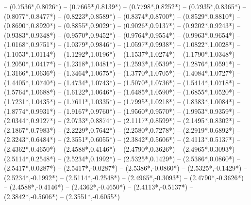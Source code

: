 {	-- ({0.7536*\dx},{0.8026*\dy})
	-- ({0.7665*\dx},{0.8139*\dy})
	-- ({0.7798*\dx},{0.8252*\dy})
	-- ({0.7935*\dx},{0.8365*\dy})
	-- ({0.8077*\dx},{0.8477*\dy})
	-- ({0.8223*\dx},{0.8589*\dy})
	-- ({0.8374*\dx},{0.8700*\dy})
	-- ({0.8529*\dx},{0.8810*\dy})
	-- ({0.8690*\dx},{0.8920*\dy})
	-- ({0.8855*\dx},{0.9029*\dy})
	-- ({0.9026*\dx},{0.9137*\dy})
	-- ({0.9202*\dx},{0.9243*\dy})
	-- ({0.9383*\dx},{0.9348*\dy})
	-- ({0.9570*\dx},{0.9452*\dy})
	-- ({0.9764*\dx},{0.9554*\dy})
	-- ({0.9963*\dx},{0.9654*\dy})
	-- ({1.0168*\dx},{0.9751*\dy})
	-- ({1.0379*\dx},{0.9846*\dy})
	-- ({1.0597*\dx},{0.9938*\dy})
	-- ({1.0822*\dx},{1.0028*\dy})
	-- ({1.1053*\dx},{1.0114*\dy})
	-- ({1.1292*\dx},{1.0196*\dy})
	-- ({1.1537*\dx},{1.0274*\dy})
	-- ({1.1790*\dx},{1.0348*\dy})
	-- ({1.2050*\dx},{1.0417*\dy})
	-- ({1.2318*\dx},{1.0481*\dy})
	-- ({1.2593*\dx},{1.0539*\dy})
	-- ({1.2876*\dx},{1.0591*\dy})
	-- ({1.3166*\dx},{1.0636*\dy})
	-- ({1.3464*\dx},{1.0675*\dy})
	-- ({1.3770*\dx},{1.0705*\dy})
	-- ({1.4084*\dx},{1.0727*\dy})
	-- ({1.4405*\dx},{1.0740*\dy})
	-- ({1.4734*\dx},{1.0743*\dy})
	-- ({1.5070*\dx},{1.0736*\dy})
	-- ({1.5414*\dx},{1.0718*\dy})
	-- ({1.5764*\dx},{1.0688*\dy})
	-- ({1.6122*\dx},{1.0646*\dy})
	-- ({1.6485*\dx},{1.0590*\dy})
	-- ({1.6855*\dx},{1.0520*\dy})
	-- ({1.7231*\dx},{1.0435*\dy})
	-- ({1.7611*\dx},{1.0335*\dy})
	-- ({1.7995*\dx},{1.0218*\dy})
	-- ({1.8383*\dx},{1.0084*\dy})
	-- ({1.8774*\dx},{0.9931*\dy})
	-- ({1.9167*\dx},{0.9760*\dy})
	-- ({1.9560*\dx},{0.9570*\dy})
	-- ({1.9953*\dx},{0.9359*\dy})
	-- ({2.0344*\dx},{0.9127*\dy})
	-- ({2.0733*\dx},{0.8874*\dy})
	-- ({2.1117*\dx},{0.8599*\dy})
	-- ({2.1495*\dx},{0.8302*\dy})
	-- ({2.1867*\dx},{0.7983*\dy})
	-- ({2.2229*\dx},{0.7642*\dy})
	-- ({2.2580*\dx},{0.7278*\dy})
	-- ({2.2919*\dx},{0.6892*\dy})
	-- ({2.3243*\dx},{0.6484*\dy})
	-- ({2.3551*\dx},{0.6055*\dy})
	-- ({2.3842*\dx},{0.5606*\dy})
	-- ({2.4113*\dx},{0.5137*\dy})
	-- ({2.4362*\dx},{0.4650*\dy})
	-- ({2.4588*\dx},{0.4146*\dy})
	-- ({2.4790*\dx},{0.3626*\dy})
	-- ({2.4965*\dx},{0.3093*\dy})
	-- ({2.5114*\dx},{0.2548*\dy})
	-- ({2.5234*\dx},{0.1992*\dy})
	-- ({2.5325*\dx},{0.1429*\dy})
	-- ({2.5386*\dx},{0.0860*\dy})
	-- ({2.5417*\dx},{0.0287*\dy})
	-- ({2.5417*\dx},{-0.0287*\dy})
	-- ({2.5386*\dx},{-0.0860*\dy})
	-- ({2.5325*\dx},{-0.1429*\dy})
	-- ({2.5234*\dx},{-0.1992*\dy})
	-- ({2.5114*\dx},{-0.2548*\dy})
	-- ({2.4965*\dx},{-0.3093*\dy})
	-- ({2.4790*\dx},{-0.3626*\dy})
	-- ({2.4588*\dx},{-0.4146*\dy})
	-- ({2.4362*\dx},{-0.4650*\dy})
	-- ({2.4113*\dx},{-0.5137*\dy})
	-- ({2.3842*\dx},{-0.5606*\dy})
	-- ({2.3551*\dx},{-0.6055*\dy})
}
